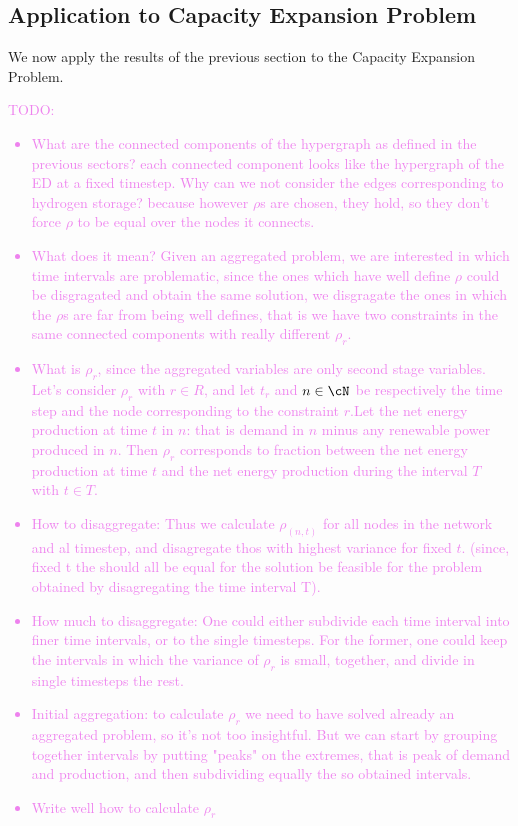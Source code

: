\subsection{Application to Capacity Expansion Problem}
{\color{violet}
We now apply the results of the previous section to the Capacity Expansion Problem. 
\textcolor{violet}{
TODO:
\begin{itemize}
  \item What are the connected components of the hypergraph as defined in the previous sectors? each connected component looks like the hypergraph of the ED at a fixed timestep. Why can we not consider the edges corresponding to hydrogen storage? because however \(\rho\)s are chosen, they hold, so they don't force \(\rho\) to be equal over the nodes it connects.
  \item What does it mean? Given an aggregated problem, we are interested in which time intervals are problematic, since the ones which have well define \(\rho\) could be disgragated and obtain the same solution, we disgragate the ones in which the \(\rho\)s are far from being well defines, that is we have two constraints in the same connected components with really different \(\rho_r\).
  \item What is \(\rho_r\), since the aggregated variables are only second stage variables. Let's consider \(\rho_r\) with \(r \in R\), and let \(t_r\) and \(n \in \cN\) be respectively the time step and the node corresponding to the constraint \(r\).Let the net energy production at time \(t\) in \(n\): that is demand in \(n\) minus any renewable power produced in \(n\). Then \(\rho_r\) corresponds to fraction between the net energy production at time \(t\) and the net energy production during the interval \(T\) with \(t \in T\).
  \item How to disaggregate: Thus we calculate \(\rho_(n,t)\) for all nodes in the network and al timestep, and disagregate thos with highest variance for fixed \(t\). (since, fixed t the should all be equal for the solution be feasible for the problem obtained by disagregating the time interval T). \\
  \item How much to disaggregate: One could either subdivide each time interval into finer time intervals, or to the single timesteps. For the former, one could keep the intervals in which the variance of \(\rho_r\) is small, together, and divide in single timesteps the rest.
  \item Initial aggregation: to calculate \(\rho_r\) we need to have solved already an aggregated problem, so it's not too insightful. But we can start by grouping together intervals by putting "peaks" on the extremes, that is peak of demand and production, and then subdividing equally the so obtained intervals.
  \item Write well how to calculate \(\rho_r\)
\end{itemize}
}

}
